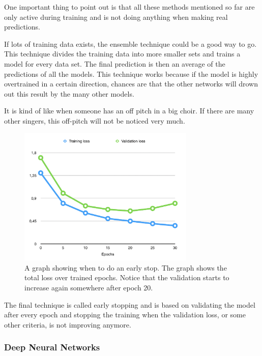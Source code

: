 One important thing to point out is that all these methods mentioned so far are only active during training and is not doing anything when making real predictions.


If lots of training data exists, the ensemble technique could be a good way to go. This technique divides the training data into more smaller sets and trains a model for every data set.
The final prediction is then an average of the predictions of all the models. This technique works because if the model is highly overtrained in a certain direction, chances are that the other networks will drown out this result by the many other models.

It is kind of like when someone has an off pitch in a big choir. If there are many other singers, this off-pitch will not be noticed very much.

\begin{figure}[hbtp]
\begin{center}
\includegraphics[width = 0.75\textwidth]{./Images/early_stop.jpg} 
\caption{A graph showing when to do an early stop. The graph shows the total loss over trained epochs. Notice that the validation starts to increase again somewhere after epoch 20.}
\end{center}
\end{figure}

The final technique is called early stopping and is based on validating the model after every epoch and stopping the training when the validation loss, or some other criteria, is not improving anymore.

\subsubsection{Deep Neural Networks}


